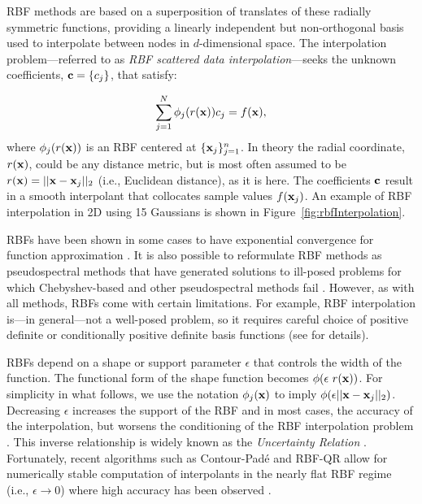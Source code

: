 \documentclass[11pt]{report}
\begin{document}
{RBF methods are based on a superposition of translates of these radially symmetric functions, providing a linearly independent but non-orthogonal basis used to interpolate between nodes in $d$-dimensional space. The interpolation problem---referred to as \emph{RBF scattered data interpolation}---seeks the unknown coefficients, $\mathbf{c} = \{c_j\}$, that satisfy: 
 
\begin{eqnarray*}
    \sum_{j=1}^{N} \phi_j(r(\mathbf{x})) c_{j}   = f(\mathbf{x}),
\end{eqnarray*}
where $\phi_j(r(\mathbf{x}))$ is an RBF centered at $\{\mathbf{x}_j\}_{j=1}^{n}$. In theory the radial coordinate, $r(\mathbf{x})$, could be any distance metric, but is most often assumed to be $r(\mathbf{x}) = ||\mathbf{x}-\mathbf{x}_j||_2$ (i.e., Euclidean distance), as it is here. The coefficients $\mathbf{c}$ result in a smooth interpolant that collocates sample values $f(\mathbf{x}_j)$. An example of RBF interpolation in 2D using 15 Gaussians is shown in Figure~\ref{fig:rbfInterpolation}. 



RBFs have been shown in 
some cases to have exponential convergence for function approximation \cite{Fasshauer2007}. It is also possible to 
reformulate RBF methods as pseudospectral methods that have 
generated solutions to ill-posed problems for which Chebyshev-based and other pseudospectral methods 
fail \cite{Fasshauer2006}. However, as with all methods, RBFs come with certain limitations. For example, RBF interpolation is---in general---not a well-posed problem, so it requires careful choice of positive definite or conditionally positive definite basis functions (see \cite{Iske2004, Fasshauer2007} for details). 

RBFs depend on a shape or support parameter $\epsilon$ that controls the width of the function. The functional form of the shape function becomes $\phi(\epsilon\  r(\mathbf{x}))$. For simplicity in what follows, we use the notation $\phi_j(\mathbf{x})$ to imply $\phi(\epsilon ||\mathbf{x}-\mathbf{x}_j||_2)$. Decreasing $\epsilon$ increases the support of the RBF and in most cases, the accuracy of the interpolation, but worsens the conditioning of the RBF interpolation problem \cite{Schaback1995}. This inverse relationship is widely known as the \emph{Uncertainty Relation} \cite{Schaback1995, Iske2004}. 
Fortunately, recent algorithms such as Contour-Pad\'{e} \cite{Fornberg2004} and RBF-QR \cite{Fornberg2007, Fornberg2011a} allow for numerically stable computation of interpolants in the nearly flat RBF regime (i.e., $\epsilon \rightarrow 0$) where high accuracy has been observed \cite{Larsson2003, Fornberg2008}. 


}
\end{document}
